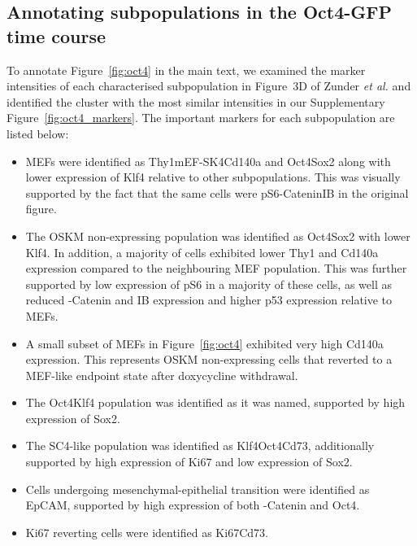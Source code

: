 \documentclass{article}
\begin{document}
\subsection{Annotating subpopulations in the Oct4-GFP time course}
To annotate Figure~\ref{fig:oct4} in the main text, we examined the marker intensities of each characterised subpopulation in Figure~3D of Zunder \emph{et al.} \cite{zunder2015continuous} and identified the cluster with the most similar intensities in our Supplementary Figure~\ref{fig:oct4_markers}.
The important markers for each subpopulation are listed below:
\begin{itemize}
    \item MEFs were identified as Thy1\hi{}mEF-SK4\hi{}Cd140a\hi{} and Oct4\lo{}Sox2\lo{} along with lower expression of Klf4 relative to other subpopulations.
        This was visually supported by the fact that the same cells were pS6\hi{}\textbeta-Catenin\hi{}I\textkappa{}B\textalpha\hi{} in the original figure.
    \item The OSKM non-expressing population was identified as Oct4\lo{}Sox2\lo{} with lower Klf4.
        In addition, a majority of cells exhibited lower Thy1 and Cd140a expression compared to the neighbouring MEF population.
        This was further supported by low expression of pS6 in a majority of these cells, as well as reduced \textbeta-Catenin and I\textkappa{}B\textalpha{} expression and higher p53 expression relative to MEFs.
    \item A small subset of MEFs in Figure~\ref{fig:oct4} exhibited very high Cd140a expression.
This represents OSKM non-expressing cells that reverted to a MEF-like endpoint state after doxycycline withdrawal.
    \item The Oct4\hi{}Klf4\hi{} population was identified as it was named, supported by high expression of Sox2.
    \item The SC4-like population was identified as Klf4\hi{}Oct4\hi{}Cd73\hi{}, additionally supported by high expression of Ki67 and low expression of Sox2.
    \item Cells undergoing mesenchymal-epithelial transition were identified as EpCAM\hi{}, supported by high expression of both \textbeta-Catenin and Oct4.
    \item Ki67\lo{} reverting cells were identified as Ki67\lo{}Cd73\hi{}.

\end{itemize}
\end{document}
